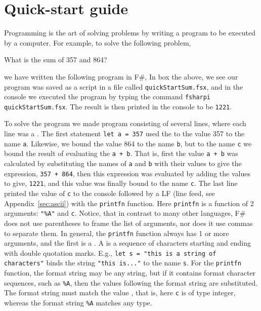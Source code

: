 \chapter{Quick-start guide}
Programming is the art of solving problems by writing a program to be executed by a computer. For example, to solve the following problem,
%
\begin{problem}
  What is the sum of 357 and 864?
\end{problem}
%
we have written the following program in F\#,
%
%
In box the above, we see our program was saved as a script in a file called \texttt{quickStartSum.fsx}, and in the console we executed the program by typing the command \lstinline|fsharpi quickStartSum.fsx|. The result is then printed in the console to be \texttt{1221}.

To solve the program we made program consisting of several lines, where each line was a . The first statement \lstinline|let a = 357| used the   to  the value 357 to the name \lstinline|a|. Likewise, we bound the value 864 to the name \lstinline|b|, but to the name \lstinline|c| we bound the result of evaluating the  \lstinline|a + b|. That is, first the value \lstinline|a + b| was calculated by substituting the names of \lstinline|a| and \lstinline|b| with their values to give the expression, \lstinline|357 + 864|, then this expression was evaluated by adding the values to give, \lstinline|1221|, and this value was finally bound to the name \lstinline|c|. The last line printed the value of \lstinline|c| to the console followed by a LF (line feed, see Appendix~\ref{sec:ascii}) with the \lstinline|printfn| function. Here \lstinline|printfn| is a function of 2 arguments: \lstinline|"%A"| and \lstinline|c|. Notice, that in contrast to many other languages, F\# does not use parentheses to frame the list of arguments, nor does it use commas to separate them. In general, the \lstinline|printfn| function always has 1 or more arguments, and the first is a . A  is a sequence of characters starting and ending with double quotation marks. E.g.,  \lstinline|let s = "this is a string of characters"| binds the string \lstinline|"this is..."| to the name \lstinline|s|. For the \lstinline|printfn| function, the format string may be any string, but if it contains format character sequences, such as \lstinline|%A|, then the values following the format string are substituted. The format string must match the value , that is, here \lstinline|c| is of type integer, whereas the format string \lstinline|%A| matches any type.

